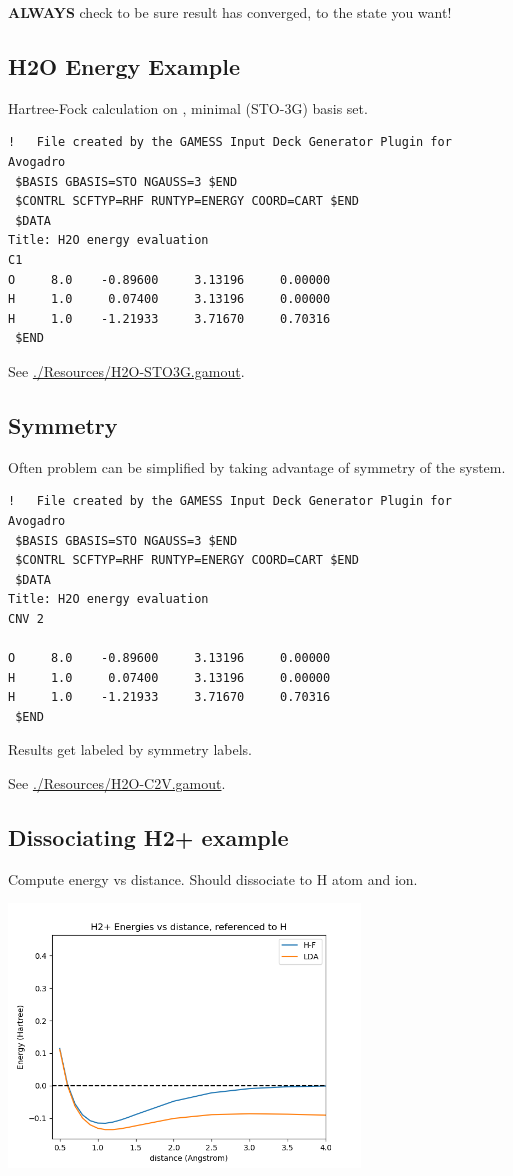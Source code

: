 \documentclass[11pt]{article}
\begin{document}
\textbf{ALWAYS} check to be sure result has converged, to the state you want!

\subsection{H2O Energy Example}
\label{sec:org0ffb92c}
Hartree-Fock calculation on , minimal (STO-3G) basis set.
\begin{verbatim}
!   File created by the GAMESS Input Deck Generator Plugin for Avogadro
 $BASIS GBASIS=STO NGAUSS=3 $END
 $CONTRL SCFTYP=RHF RUNTYP=ENERGY COORD=CART $END
 $DATA 
Title: H2O energy evaluation
C1
O     8.0    -0.89600     3.13196     0.00000
H     1.0     0.07400     3.13196     0.00000
H     1.0    -1.21933     3.71670     0.70316
 $END
\end{verbatim}

See \url{./Resources/H2O-STO3G.gamout}.
\subsection{Symmetry}
\label{sec:orgcaa9d51}
Often problem can be simplified by taking advantage of symmetry of the system.
\begin{verbatim}
!   File created by the GAMESS Input Deck Generator Plugin for Avogadro
 $BASIS GBASIS=STO NGAUSS=3 $END
 $CONTRL SCFTYP=RHF RUNTYP=ENERGY COORD=CART $END
 $DATA 
Title: H2O energy evaluation
CNV 2

O     8.0    -0.89600     3.13196     0.00000
H     1.0     0.07400     3.13196     0.00000
H     1.0    -1.21933     3.71670     0.70316
 $END
\end{verbatim}

Results get labeled by symmetry labels.

See \url{./Resources/H2O-C2V.gamout}.

\subsection{Dissociating H2+ example}
\label{sec:orgef06f9c}
Compute energy vs distance.  Should dissociate to H atom and  ion.
\begin{center}
\includegraphics[width=0.7\textwidth]{./Images/H2+.png}
\end{center}
\end{document}
